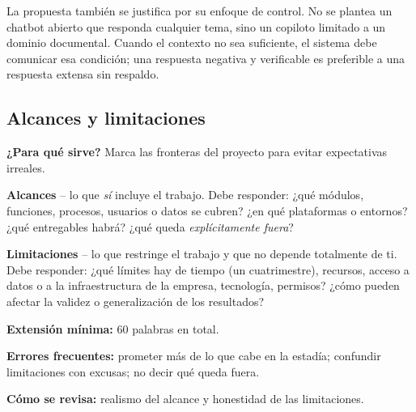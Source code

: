 La propuesta también se justifica por su enfoque de control. No se plantea un chatbot abierto que responda cualquier tema, sino un copiloto limitado a un dominio documental. Cuando el contexto no sea suficiente, el sistema debe comunicar esa condición; una respuesta negativa y verificable es preferible a una respuesta extensa sin respaldo.


\subsection{Alcances y limitaciones} \label{sec:alcances_limitaciones} %

\begin{guia}
\textbf{¿Para qué sirve?} Marca las fronteras del proyecto para evitar expectativas irreales.

\textbf{Alcances} -- lo que \emph{sí} incluye el trabajo. Debe responder: ¿qué módulos, funciones, procesos, usuarios o
datos se cubren? ¿en qué plataformas o entornos? ¿qué entregables habrá? ¿qué queda \emph{explícitamente fuera}?

\textbf{Limitaciones} -- lo que restringe el trabajo y que no depende totalmente de ti. Debe responder: ¿qué límites hay
de tiempo (un cuatrimestre), recursos, acceso a datos o a la infraestructura de la empresa, tecnología, permisos?
¿cómo pueden afectar la validez o generalización de los resultados?

\textbf{Extensión mínima:} 60 palabras en total.

\textbf{Errores frecuentes:} prometer más de lo que cabe en la estadía; confundir limitaciones con excusas; no decir qué
queda fuera.

\textbf{Cómo se revisa:} realismo del alcance y honestidad de las limitaciones.
\end{guia}


